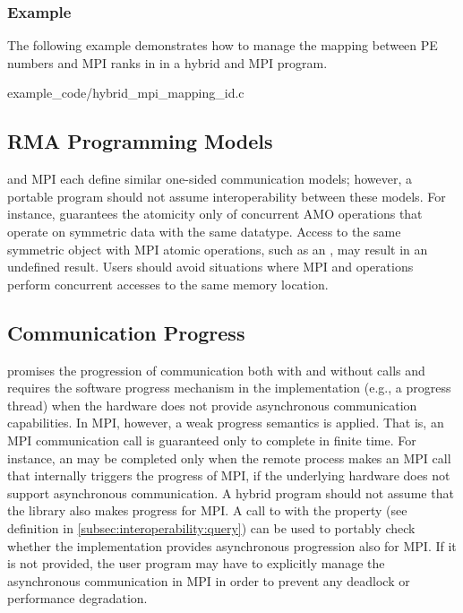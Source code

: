 \subsubsection*{Example}
\label{subsubsec:interoperability:id:example}
The following example demonstrates how to manage the mapping between \openshmem
PE numbers and MPI ranks in  in a hybrid \openshmem
and MPI program.


      {example_code/hybrid_mpi_mapping_id.c}

\subsection{RMA Programming Models}
\label{subsec:interoperability:rma}

\openshmem and MPI each define similar one-sided communication models;
however, a portable program should not assume interoperability between these
models.
For instance, \openshmem guarantees the atomicity only of concurrent \openshmem AMO operations
that operate on symmetric data with the same datatype. Access to the same symmetric
object with MPI atomic operations, such as an , may
result in an undefined result. Users should avoid situations where MPI and
\openshmem operations perform concurrent accesses to the same memory location.

\subsection{Communication Progress}
\label{subsec:interoperability:progress}

\openshmem promises the progression of communication both with and without
\openshmem calls and requires the software progress mechanism in the implementation
(e.g., a progress thread) when the hardware does not provide asynchronous communication
capabilities. In MPI, however, a weak progress semantics is applied. That is,
an MPI communication call is guaranteed only to complete in finite time. For
instance, an  may be completed only when the remote process makes an MPI
call that internally triggers the progress of MPI, if the underlying hardware
does not support asynchronous communication. A hybrid program
should not assume that the \openshmem library also makes progress for MPI.
A call to  with the 
property (see definition in \ref{subsec:interoperability:query})
can be used to portably check whether the implementation provides asynchronous
progression also for MPI. If it is not provided, the user program may have to
explicitly manage the asynchronous communication in MPI in
order to prevent any deadlock or performance degradation.

